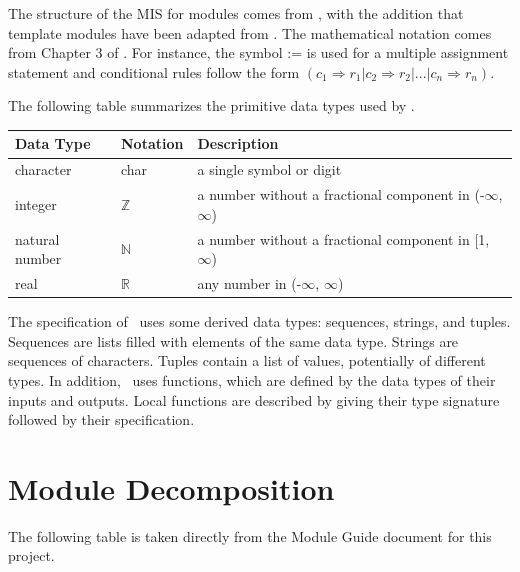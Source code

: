 \documentclass[12pt, titlepage]{article}
\begin{document}

The structure of the MIS for modules comes from \citet{HoffmanAndStrooper1995},
with the addition that template modules have been adapted from
\cite{GhezziEtAl2003}.  The mathematical notation comes from Chapter 3 of
\citet{HoffmanAndStrooper1995}.  For instance, the symbol := is used for a
multiple assignment statement and conditional rules follow the form $(c_1
\Rightarrow r_1 | c_2 \Rightarrow r_2 | ... | c_n \Rightarrow r_n )$.

The following table summarizes the primitive data types used by \progname. 

\begin{center}
\renewcommand{\arraystretch}{1.2}
\noindent 
\begin{tabular}{l l p{7.5cm}} 
\toprule 
\textbf{Data Type} & \textbf{Notation} & \textbf{Description}\\ 
\midrule
character & char & a single symbol or digit\\
integer & $\mathbb{Z}$ & a number without a fractional component in (-$\infty$, $\infty$) \\
natural number & $\mathbb{N}$ & a number without a fractional component in [1, $\infty$) \\
real & $\mathbb{R}$ & any number in (-$\infty$, $\infty$)\\
\bottomrule
\end{tabular} 
\end{center}

\noindent
The specification of \progname \ uses some derived data types: sequences, strings, and
tuples. Sequences are lists filled with elements of the same data type. Strings
are sequences of characters. Tuples contain a list of values, potentially of
different types. In addition, \progname \ uses functions, which
are defined by the data types of their inputs and outputs. Local functions are
described by giving their type signature followed by their specification.

\section{Module Decomposition}

The following table is taken directly from the Module Guide document for this project.
\end{document}
